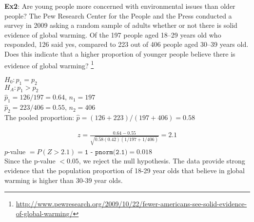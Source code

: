 \documentclass[12pt, fleqn]{article}\usepackage[]{graphicx}\usepackage[]{color}
\begin{document}
\clearpage
\textbf{Ex2}: Are young people more concerned with environmental issues than older people? The Pew Research Center for the People and the Press conducted a survey in 2009 asking a random sample of adults whether or not there is solid evidence of global warming. Of the 197 people aged 18–29 years old who responded, 126 said yes, compared to 223 out of 406 people aged 30–39 years old. Does this indicate that a higher proportion of younger people believe there is evidence of global warming?
\footnote{\url{http://www.pewresearch.org/2009/10/22/fewer-americans-see-solid-evidence-of-global-warming/}}\\

{\color{blue}
$H_0: p_1 = p_2$\\
$H_A: p_1 > p_2$\\

$\hat{p}_1 = 126/197 = 0.64$, $n_1 = 197$\\
$\hat{p}_2 = 223/406 = 0.55$, $n_2 = 406$\\
The pooled proportion: $\hat{p} = (126 + 223) / (197 + 406) = 0.58$

\begin{align*}
z = \frac{0.64 - 0.55}{\sqrt{0.58(0.42)(1/197 + 1/406)}} = 2.1
\end{align*}
$p$-value $= P(Z > 2.1) = \texttt{1 - pnorm(2.1)} = 0.018$\\

Since the p-value $<0.05$, we reject the null hypothesis.  The data provide strong evidence that the population proportion of 18-29 year olds that believe in global warming is higher than 30-39 year olds.
}
\end{document}

